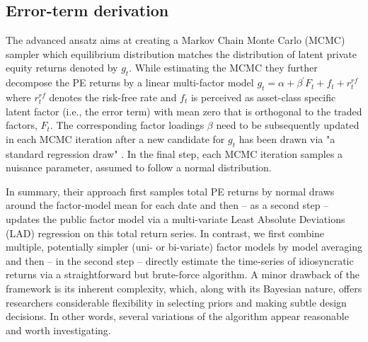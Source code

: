 \subsection{Error-term derivation}

The advanced \cite{ACGP18} ansatz aims at creating a Markov Chain Monte Carlo (MCMC) sampler which equilibrium distribution matches the distribution of latent private equity returns denoted by $g_t$.
While estimating the MCMC they further decompose the PE returns by a linear multi-factor model $g_t = \alpha + \beta^{'} F_t + f_t + r_t^{rf}$ where $ r_t^{rf}$ denotes the risk-free rate and $f_t$ is perceived as asset-class specific latent factor (i.e., the error term) with mean zero that is orthogonal to the traded factors, $F_t$.
The corresponding factor loadings $\beta$ need to be subsequently updated in each MCMC iteration after a new candidate for $g_t$ has been drawn via "a standard regression draw" \cite[internet appendix, p.4]{ACGP18}.
In the final step, each MCMC iteration samples a nuisance parameter, assumed to follow a normal distribution. 

In summary, their approach first samples total PE returns by normal draws around the factor-model mean for each date and then -- as a second step -- updates the public factor model via a multi-variate Least Absolute Deviations (LAD) regression on this total return series.
In contrast, we first combine multiple, potentially simpler (uni- or bi-variate) factor models by model averaging and then -- in the second step -- directly estimate the time-series of idiosyncratic returns via a straightforward but brute-force algorithm.
A minor drawback of the \cite{ACGP18} framework is its inherent complexity, which, along with its Bayesian nature, offers researchers considerable flexibility in selecting priors and making subtle design decisions.
In other words, several variations of the \cite{ACGP18} algorithm appear reasonable and worth investigating.
